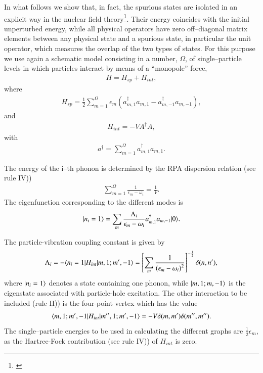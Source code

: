 In what follows we show that, in fact, the spurious states are isolated in an
explicit way in the nuclear field theory\footnote{\cite{Broglia:76}}. Their energy coincides with the
initial unperturbed  energy, while all physical operators have zero off--diagonal
matrix elements between any physical state and a spurious state, in particular
the unit operator, which measures the overlap of the two types of states.
For this purpose we use again a schematic model consisting in a number, $\Omega$,
of single--particle levels in which particles interact by means of a ``monopole''
force,
 \begin{align}\label{eqC1A46} 
H=H_{sp}+H_{int},
 \end{align}
where
 \begin{align}\label{eqC1A47} 
H_{sp}=\frac{1}{2}\sum_{m=1}^\Omega\epsilon_m\left(a^\dagger_{m,1}a_{m,1}-a^\dagger_{m,-1}a_{m,-1}\right),
 \end{align}
and
 \begin{align}\label{eqC1A48} 
H_{int}=-VA^\dagger A,
 \end{align}
with
 \begin{align}\label{eqC1A49} 
 a^\dagger=\sum_{m=1}^\Omega a^\dagger_{m,1}a_{m,1}.
 \end{align}

The energy of the i--th phonon is determined by the RPA dispersion relation (see rule IV)) 
 \begin{align}\label{eqC1A50} 
\sum_{m=1}^{\Omega}\frac{1}{\epsilon_m-\omega_i}=\frac{1}{V}.
 \end{align}
The eigenfunction corresponding to the different modes is 
 \begin{align}\label{eqC1A51} 
|{n_i=1} \rangle=\sum_m\frac{\Lambda_i}{\epsilon_m-\omega_i}a^\dagger_{m,1}a_{m,-1}|{0} \rangle.
 \end{align}


The particle-vibration coupling constant is given by 
 \begin{align}\label{eqC1A52} 
\Lambda_i=-\langle {n_i=1|H_{int}|m,1;m',-1} \rangle=\left[\sum_m\frac{1}{\left(\epsilon_m-\omega_i\right)^2}\right]^{-\frac{1}{2}}\delta(n,n'),
 \end{align} 
where $|{n_i=1} \rangle$ denotes a state containing one phonon, while $|{m,1;m,-1} \rangle$ is the eigenstate associated with particle-hole excitation. The other interaction to be included (rule II)) is the four-point vertex which has the value 
 \begin{align}\label{eqC1A53} 
\langle {m,1;m',-1|H_{int}|m'',1;m',-1} \rangle=-V\delta(m,m')\delta(m'',m'').
 \end{align} 
The single--particle energies to be used in calculating the different graphs are $\frac{1}{2}\epsilon_m$, as the Hartree-Fock contribution (see rule IV)) of $H_{int}$ is zero. 


